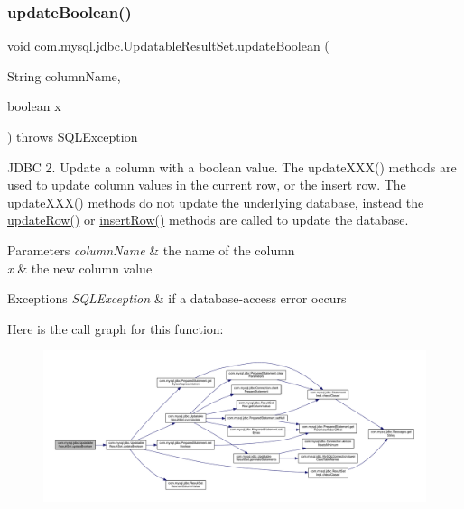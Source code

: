 \subsubsection{\texorpdfstring{update\+Boolean()}{updateBoolean()}\hspace{0.1cm}{\footnotesize\ttfamily [2/2]}}
{\footnotesize\ttfamily void com.\+mysql.\+jdbc.\+Updatable\+Result\+Set.\+update\+Boolean (\begin{DoxyParamCaption}\item[{String}]{column\+Name,  }\item[{boolean}]{x }\end{DoxyParamCaption}) throws S\+Q\+L\+Exception}

J\+D\+BC 2. Update a column with a boolean value. The update\+X\+X\+X() methods are used to update column values in the current row, or the insert row. The update\+X\+X\+X() methods do not update the underlying database, instead the \mbox{\hyperlink{classcom_1_1mysql_1_1jdbc_1_1_updatable_result_set_a919969ba4b3c7cbc7b18605e9f31a746}{update\+Row()}} or \mbox{\hyperlink{classcom_1_1mysql_1_1jdbc_1_1_updatable_result_set_aef041f8d9d0778083716fc26652648fa}{insert\+Row()}} methods are called to update the database.


\begin{DoxyParams}{Parameters}
{\em column\+Name} & the name of the column \\
\hline
{\em x} & the new column value\\
\hline
\end{DoxyParams}

\begin{DoxyExceptions}{Exceptions}
{\em S\+Q\+L\+Exception} & if a database-\/access error occurs \\
\hline
\end{DoxyExceptions}
Here is the call graph for this function\+:
\nopagebreak
\begin{figure}[H]
\begin{center}
\leavevmode
\includegraphics[width=350pt]{classcom_1_1mysql_1_1jdbc_1_1_updatable_result_set_a5070cb2945792ee2e9f66f659df8b38a_cgraph}
\end{center}
\end{figure}
\mbox{\label{classcom_1_1mysql_1_1jdbc_1_1_updatable_result_set_a82e4ac17d1f8d3b8cdb10d1a6220796d}} 
